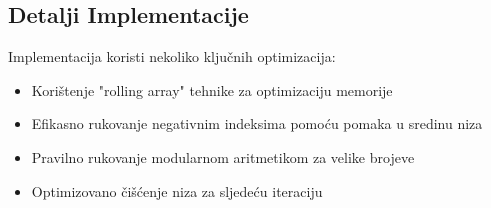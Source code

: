 \subsection{Detalji Implementacije}
Implementacija koristi nekoliko ključnih optimizacija:
\begin{itemize}
    \item Korištenje "rolling array" tehnike za optimizaciju memorije
    \item Efikasno rukovanje negativnim indeksima pomoću pomaka u sredinu niza
    \item Pravilno rukovanje modularnom aritmetikom za velike brojeve
    \item Optimizovano čišćenje niza za sljedeću iteraciju
\end{itemize} 